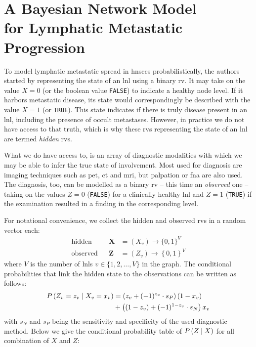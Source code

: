 \documentclass[\relativeRoot/main.tex]{subfiles}
\begin{document}
\section[Bayesian Network Model for Lymphatic Spread]{A Bayesian Network Model\\for Lymphatic Metastatic Progression}
\label{sec:previous_work:bayesian_network}

To model lymphatic metastatic spread in \glspl{hnscc} probabilistically, the authors  started by representing the state of an \gls{lnl} using a binary \gls{rv}. It may take on the value $X=0$ (or the boolean value \texttt{FALSE}) to indicate a healthy node level. If it harbors metastatic disease, its state would correspondingly be described with the value $X=1$ (or \texttt{TRUE}). This state indicates if there is truly disease present in an \gls{lnl}, including the presence of occult metastases. However, in practice we do not have access to that truth, which is why these \glspl{rv} representing the state of an \gls{lnl} are termed \emph{hidden} \glspl{rv}.

What we do have access to, is an array of diagnostic modalities with which we may be able to infer the true state of involvement. Most used for diagnosis are imaging techniques such as \gls{pet}, \gls{ct} and \gls{mri}, but palpation or \gls{fna} are also used. The diagnosis, too, can be modelled as a binary \gls{rv} -- this time an \emph{observed} one -- taking on the values $Z=0$ (\texttt{FALSE}) for a clinically healthy \gls{lnl} and $Z=1$ (\texttt{TRUE}) if the examination resulted in a finding in the corresponding level.

For notational convenience, we collect the hidden and observed \glspl{rv} in a random vector each:
%
\begin{equation} \label{eq:bn:variables}
    \begin{aligned}
        \text{hidden}& & \mathbf{X} &= ( X_v ) \rightarrow \{ 0,1 \}^V \\
        \text{observed}& & \mathbf{Z} &= ( Z_v ) \rightarrow \left\{ 0, 1 \right\}^V
    \end{aligned}
\end{equation}
%
where $V$ is the number of \glspl{lnl} $v \in \{ 1,2,\ldots,V \}$ in the graph. The conditional probabilities that link the hidden state to the observations can be written as follows:
%
\begin{equation}
    \begin{aligned}
        P \left( Z_v = z_v \mid X_v = x_v \right) &= \left( z_v + (-1)^{z_v} \cdot s_P \right)(1 - x_v) \\ 
        &+ \left( (1 - z_v) + (-1)^{1 - z_v} \cdot s_N \right) x_v
    \end{aligned}
\end{equation}
%
with $s_N$ and $s_P$ being the sensitivity and specificity of the used diagnostic method. Below we give the conditional probability table of $P \left( Z \mid X \right)$ for all combination of $X$ and $Z$:
\end{document}
